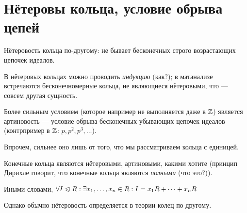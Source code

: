 \documentclass[a4paper]{report}
\begin{document}
    \section{Нётеровы кольца, условие обрыва цепей}


    Нётеровость кольца по-другому: не бывает бесконечных строго возрастающих цепочек идеалов.

    В нётеровых кольцах можно проводить \textit{индукцию} (как?); в матанализе встречаются бесконечномерные кольца, не являющиеся нётеровыми, что --- совсем другая сущность.

    Более сильным условием (которое например не выполняется даже в $\mathbb{Z}$) является артиновость --- условие обрыва бесконечных убывающих цепочек идеалов (контрпример в $\mathbb{Z}$: $p, p^2, p^3, \dots$).

    Впрочем, сильнее оно лишь от того, что мы рассматриваем кольца с единицей.


    Конечные кольца являются нётеровыми, артиновыми, какими хотите (принцип Дирихле говорит, что конечные кольца являются \textit{полными} (что это?)).


    Иными словами, $\forall I \trianglelefteqslant R: \exists x_1, \dots, x_n \in R: I = x_1 R + \dots + x_n R$

    \ok
    Однако обычно нётеровость определяется в теории колец по-другому.
\end{document}
